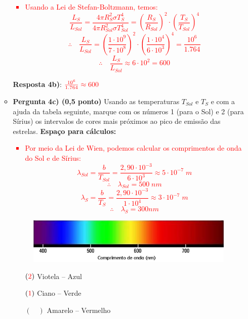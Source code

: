\documentclass[a4paper, 12pt]{article}
\newcommand{\red}[1]{\textcolor{red}{#1}}
\begin{document}
\begin{flushleft}
\begin{itemize}
\begin{itemize}
						\red{\begin{itemize}
							\item Usando a Lei de Stefan-Boltzmann, temos:
								$$\frac{L_S}{L_{Sol}} = \frac{4 \pi R_S^2 \sigma T_S^4}{4 \pi R_{Sol}^2 \sigma T_{Sol}^4} = \left( \frac{R_S}{R_{Sol}} \right)^2 \cdot \left( \frac{T_S}{T_{Sol}} \right)^4$$
								$$\therefore \quad \frac{L_S}{L_{Sol}} = \left( \frac{1 \cdot 10^9}{7 \cdot 10^8} \right)^2 \cdot \left( \frac{1 \cdot 10^4}{6 \cdot 10^3} \right)^4 = \frac{10^6}{1.764}$$
								$$\therefore \quad \frac{L_S}{L_{Sol}} \approx 6 \cdot 10^2 = 600$$
						\end{itemize}}
						\textbf{Resposta 4b)}: $\red{\frac{10^6}{1.764} \approx 600}$
					\item \textbf{Pergunta 4c) (0,5 ponto)} Usando as temperaturas $T_{Sol}$ e $T_S$ e com a ajuda da tabela seguinte, marque com os números 1 (para o Sol) e 2 (para Sírius) os intervalos de cores mais próximos ao pico de emissão das estrelas. \linebreak
						\textbf{Espaço para cálculos:}
							\red{\begin{itemize}
								\item Por meio da Lei de Wien, podemos calcular os comprimentos de onda do Sol e de Sírius:
									$$\lambda_{Sol} = \frac{b}{T_{Sol}} = \frac{2,90 \cdot 10^{-3}}{6 \cdot 10^3} \approx 5 \cdot 10^{-7} \; m$$
									$$\therefore \quad \lambda_{Sol} = 500 \; nm$$
									$$$$
									$$\lambda_S = \frac{b}{T_S} = \frac{2,90 \cdot 10^{-3}}{1 \cdot 10^{4}} \approx 3 \cdot 10^{-7} \; m$$
									$$\therefore \quad \lambda_S = 300 nm$$
							\end{itemize}}
						\begin{figure}[H]
							\centering
							\includegraphics[scale=0.5]{./img/4.png}
						\end{figure}
						\begin{multicols}{3} \begin{itemize}
							\item[$(\red{2})$] Viotela -- Azul
							\item[$(\red{1})$] Ciano -- Verde
							\item[$(\quad)$] Amarelo -- Vermelho
						\end{itemize} \end{multicols}
				\end{itemize}
		

\end{itemize}
\end{flushleft}
\end{document}
